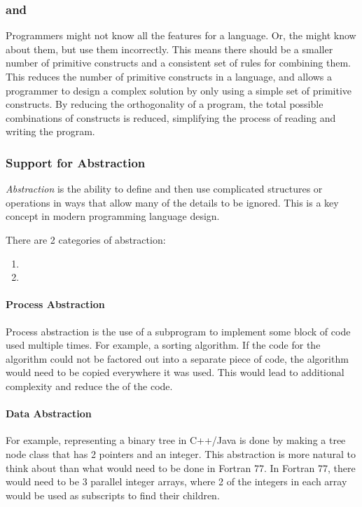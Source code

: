 \subsubsection{ and }\label{subsubsec:Written_Simplicity_Orthogonality}
Programmers might not know all the features for a language.
Or, the might know about them, but use them incorrectly.
This means there should be a smaller number of primitive constructs and a consistent set of rules for combining them.
This reduces the number of primitive constructs in a language, and allows a programmer to design a complex solution by only using a simple set of primitive constructs.
By reducing the orthogonality of a program, the total possible combinations of constructs is reduced, simplifying the process of reading and writing the program.

\subsubsection{Support for Abstraction}\label{subsubsec:Abstraction_Support}
\begin{definition}[Abstraction]\label{def:Abstraction}
  \emph{Abstraction} is the ability to define and then use complicated structures or operations in ways that allow many of the details to be ignored.
  This is a key concept in modern programming language design.

  There are 2 categories of abstraction:
  \begin{enumerate}[noitemsep]
  \item {}
  \item {}
  \end{enumerate}
\end{definition}

\paragraph{Process Abstraction}\label{par:Process_Abstraction}
Process abstraction is the use of a subprogram to implement some block of code used multiple times.
For example, a sorting algorithm.
If the code for the algorithm could not be factored out into a separate piece of code, the algorithm would need to be copied everywhere it was used.
This would lead to additional complexity and reduce the  of the code.

\paragraph{Data Abstraction}\label{par:Data_Abstraction}
For example, representing a binary tree in C++/Java is done by making a tree node class that has 2 pointers and an integer.
This abstraction is more natural to think about than what would need to be done in Fortran 77.
In Fortran 77, there would need to be 3 parallel integer arrays, where 2 of the integers in each array would be used as subscripts to find their children.

